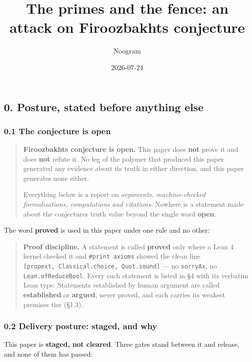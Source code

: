 \documentclass[
  a4paper,
  11pt]{article}
\title{The primes and the fence: an attack on
Firoozbakht\textquotesingle s conjecture}
\author{Noogram}
\date{2026-07-24}
\begin{document}
\maketitle

\nocite{*}

\subsection{0. Posture, stated before anything
else}\label{0-posture-stated-before-anything-else}

\subsubsection{0.1 The conjecture is
open}\label{01-the-conjecture-is-open}

\begin{quote}
\textbf{Firoozbakht\textquotesingle s conjecture is open.} This paper
does \textbf{not} prove it and does \textbf{not} refute it. No leg of
the polymer that produced this paper generated any evidence about its
truth in either direction, and this paper generates none either.

Everything below is a report on \emph{arguments, machine-checked
formalisations, computations and citations}. Nowhere is a statement made
about the conjecture\textquotesingle s truth value beyond the single
word \textbf{open}.
\end{quote}

The word \textbf{proved} is used in this paper under one rule and no
other:

\begin{quote}
\textbf{Proof discipline.} A statement is called \textbf{proved} only
where a Lean 4 kernel checked it and \texttt{\#print\ axioms} showed the
clean line \texttt{{[}propext,\ Classical.choice,\ Quot.sound{]}} --- no
\texttt{sorryAx}, no \texttt{Lean.ofReduceBool}. Every such statement is
listed in §4 with its verbatim Lean type. Statements established by
human argument are called \textbf{established} or \textbf{argued}, never
proved, and each carries its weakest premise\textquotesingle s tier
(§1.3).
\end{quote}

\subsubsection{0.2 Delivery posture: staged, and
why}\label{02-delivery-posture-staged-and-why}

This paper is \textbf{staged, not cleared}. Three gates stand between it
and release, and none of them has passed:
\end{document}
